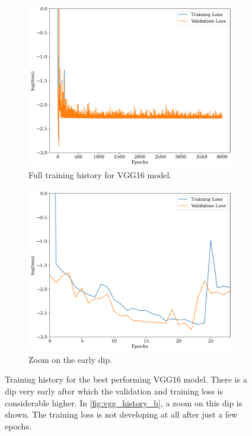 \begin{figure}[H]
\centering
\begin{subfigure}{.46\textwidth}
\centering
\includegraphics[width=\textwidth]{images/Chapter4/VGG16/vgg_history_full.png}
\caption{Full training history for VGG16 model.} 
\label{fig:vgg_history_a}
\end{subfigure}
\hspace{.6em}
\begin{subfigure}{.46\textwidth}
\centering
\includegraphics[width=\textwidth]{images/Chapter4/VGG16/vgg_history_zoom.png}
\caption{Zoom on the early dip.} 
\label{fig:vgg_history_b}
\end{subfigure}
\caption{Training history for the best performing VGG16 model. There is a dip very early after which the validation and training loss is considerable higher. In \autoref{fig:vgg_history_b}, a zoom on this dip is shown. The training loss is not developing at all after just a few epochs.}
\label{fig:vgg_history}
\end{figure}

